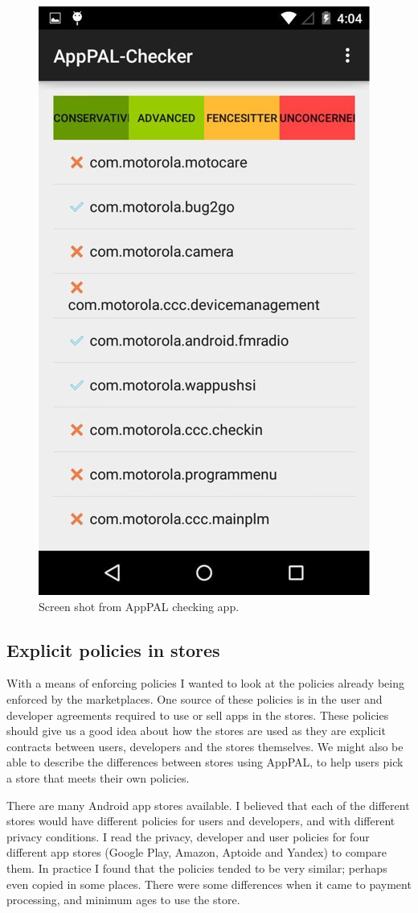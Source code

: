 \documentclass[a4paper]{scrartcl}
\begin{document}
\begin{figure}[]
  \centering
  \includegraphics[width=0.5\linewidth]{images/apppal-checker.png}
  \caption{Screen shot from AppPAL checking app.}
  \label{fig:checker}
\end{figure}

\subsection{Explicit policies in stores}

With a means of enforcing policies I wanted to look at the policies already being enforced by the marketplaces.
One source of these policies is in the user and developer agreements required to use or sell apps in the stores.
These policies should give us a good idea about how the stores are used as they are explicit contracts between users, developers and the stores themselves.
We might also be able to describe the differences between stores using AppPAL, to help users pick a store that meets their own policies.

There are many Android app stores available.
I believed that each of the different stores would have different policies for users and developers, and with different privacy conditions.
I read the privacy, developer and user policies for four different app stores (Google Play, Amazon, Aptoide and Yandex) to compare them.
In practice I found that the policies tended to be very similar; perhaps even copied in some places.
There were some differences when it came to payment processing, and minimum ages to use the store.
\end{document}
